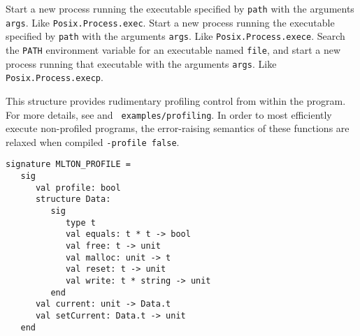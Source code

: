 \begin{description}
Start a new process running the executable specified by {\tt path} with the
arguments {\tt args}.  Like {\tt Posix.Process.exec}.
Start a new process running the executable specified by {\tt path} with the
arguments {\tt args}.  Like {\tt Posix.Process.exece}.
Search the {\tt PATH} environment variable for an executable named {\tt file},
and start a new process running that executable with the arguments {\tt args}.
Like {\tt Posix.Process.execp}.
\end{description}

This structure provides rudimentary profiling control from within the
program.  For more details, see  and {\tt
  examples/profiling}.  In order to most efficiently execute
non-profiled programs, the error-raising semantics of these functions
are relaxed when compiled {\tt -profile false}.

\begin{verbatim}
signature MLTON_PROFILE =
   sig
      val profile: bool
      structure Data:
         sig
            type t
            val equals: t * t -> bool
            val free: t -> unit
            val malloc: unit -> t
            val reset: t -> unit
            val write: t * string -> unit
         end
      val current: unit -> Data.t
      val setCurrent: Data.t -> unit
   end
\end{verbatim}

